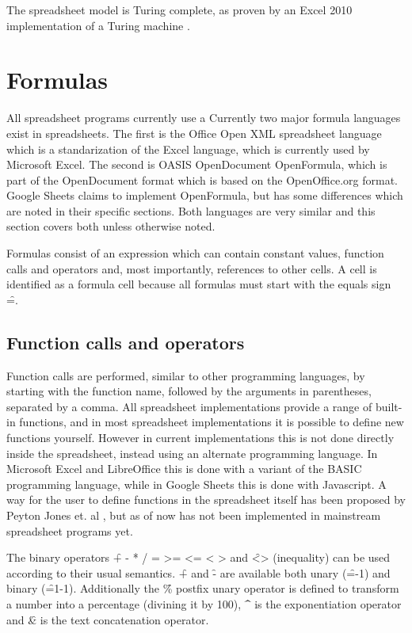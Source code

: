 The spreadsheet model is Turing complete, as proven by an Excel 2010 implementation of a Turing machine \cite{ExcelTuringComplete}.

\section{Formulas}

All spreadsheet programs currently use a 
Currently two major formula languages exist in spreadsheets. The first is the Office Open XML spreadsheet language which is a standarization of the Excel language, which is currently used by Microsoft Excel.
The second is OASIS OpenDocument OpenFormula, which is part of the OpenDocument format which is based on the OpenOffice.org format.
Google Sheets claims to implement OpenFormula, but has some differences which are noted in their specific sections.
Both languages are very similar and this section covers both unless otherwise noted.

Formulas consist of an expression which can contain constant values, function calls and operators and, most importantly, references to other cells.
A cell is identified as a formula cell because all formulas must start with the equals sign \f{=}.

\subsection{Function calls and operators}

Function calls are performed, similar to other programming languages, by starting with the function name, followed by the arguments in parentheses, separated by a comma.
All spreadsheet implementations provide a range of built-in functions, and in most spreadsheet implementations it is possible to define new functions yourself.
However in current implementations this is not done directly inside the spreadsheet, instead using an alternate programming language.
In Microsoft Excel and LibreOffice this is done with a variant of the BASIC programming language, while in Google Sheets this is done with Javascript.
A way for the user to define functions in the spreadsheet itself has been proposed by Peyton Jones et. al \cite{jones2003user}, but as of now has not been implemented in mainstream spreadsheet programs yet.

The binary operators \f{+ - * / = >= <= < >} and \f{<>} (inequality) can be used according to their usual semantics.
\f{+} and \f{-} are available both unary (\f{=-1}) and binary (\f{=1-1}).
Additionally the \f{\%} postfix unary operator is defined to transform a number into a percentage (divining it by 100), \f{\textasciicircum} is the exponentiation operator and \f{\&} is the text concatenation operator.

